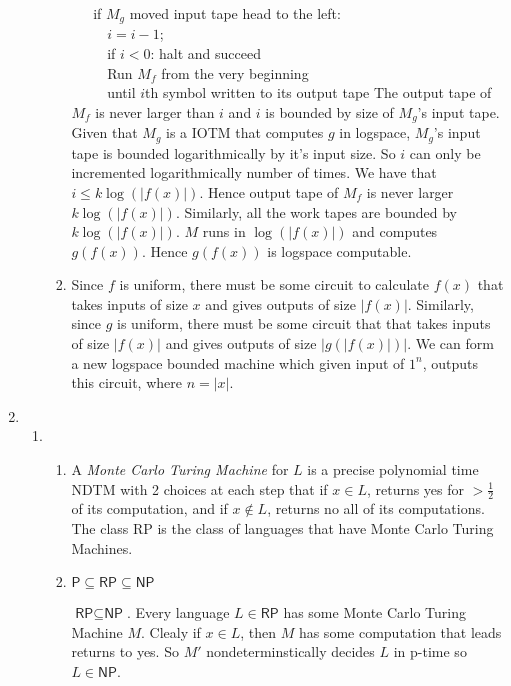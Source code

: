 \documentclass[a4paper, draft, 12pt]{article}
\begin{document}
\begin{enumerate}
\begin{enumerate}
\begin{enumerate}
  $~\quad$ if $M_g$ moved input tape head to the left: \\
  $~\quad\quad$ $i = i - 1$; \\
  $~\quad\quad$ if $i < 0$: halt and succeed \\
  $~\quad\quad$ Run $M_f$ from the very beginning   \\
  $~\quad\quad$ until $i$th symbol written to its output tape
  The output tape of $M_f$ is never larger than $i$ 
  and $i$ is bounded by size of $M_g$'s input tape.
  Given that $M_g$ is a IOTM that computes $g$ in logspace,
  $M_g$'s input tape is bounded logarithmically by 
  it's input size. So $i$ can only be incremented logarithmically
  number of times. We have that $i \leqslant k\log(|f(x)|)$.
  Hence output tape of $M_f$ is never larger $k\log(|f(x)|)$.
  Similarly, all the work tapes are bounded by $k\log(|f(x)|)$. 
  $M$ runs in $\log(|f(x)|)$ and computes $g(f(x))$. 
  Hence $g(f(x))$ is logspace computable.
  \item %
  Since $f$ is uniform, there must be some circuit to 
  calculate $f(x)$ that takes inputs of size $x$ and 
  gives outputs of size $|f(x)|$. 
  Similarly, since $g$ is uniform, there must be some 
  circuit that that takes inputs of size $|f(x)|$ and
  gives outputs of size $|g(|f(x)|)|$. 
  We can form a new logspace bounded machine 
  which given input of $1^n$, 
  outputs this circuit, where $n = |x|$. 
  \end{enumerate}
  \end{enumerate}
  \item %
  \begin{enumerate}
  \item %
  \begin{enumerate}
  \item %
  A \textit{Monte Carlo Turing Machine} for $L$ is 
  a precise polynomial time NDTM with 2 choices at each step that
  if $x \in L$, returns yes for $> \frac{1}{2}$ of its computation, 
  and if $x \notin L$, returns no all of its computations. 
  The class \textsf{RP} is the class of languages that have Monte Carlo Turing Machines.
  \item %
  $\textsf{P} \subseteq \textsf{RP} \subseteq \textsf{NP}$ 

  $\textsf{RP} \subseteq \textsf{NP}$. Every language $L \in \textsf{RP}$ has some 
  Monte Carlo Turing Machine $M$. Clealy if $x \in L$, then $M$ has 
  some computation that leads returns to yes. So $M'$
  nondeterminstically decides $L$ in p-time so $L \in \textsf{NP}$.


\end{enumerate}
\end{enumerate}
\end{enumerate}
\end{document}
